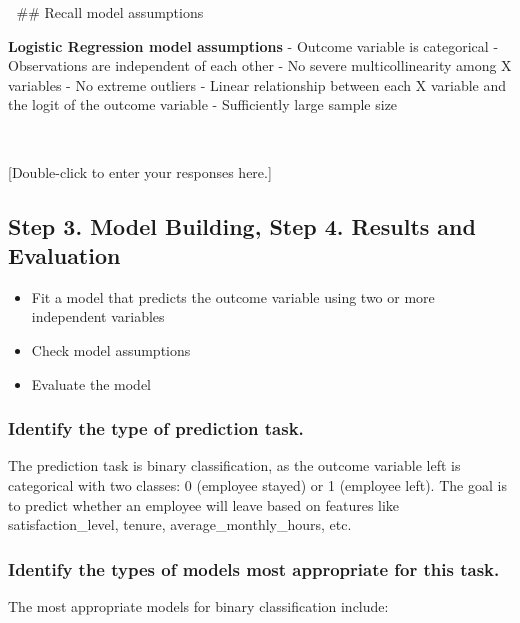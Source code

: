 \documentclass[11pt]{article}
\providecommand{\tightlist}{%
      \setlength{\itemsep}{0pt}\setlength{\parskip}{0pt}}
\begin{document}
    🔎 \#\# Recall model assumptions

\textbf{Logistic Regression model assumptions} - Outcome variable is
categorical - Observations are independent of each other - No severe
multicollinearity among X variables - No extreme outliers - Linear
relationship between each X variable and the logit of the outcome
variable - Sufficiently large sample size

    💭

    {[}Double-click to enter your responses here.{]}

    \hypertarget{step-3.-model-building-step-4.-results-and-evaluation}{%
\subsection{Step 3. Model Building, Step 4. Results and
Evaluation}\label{step-3.-model-building-step-4.-results-and-evaluation}}

\begin{itemize}
\tightlist
\item
  Fit a model that predicts the outcome variable using two or more
  independent variables
\item
  Check model assumptions
\item
  Evaluate the model
\end{itemize}

    \hypertarget{identify-the-type-of-prediction-task.}{%
\subsubsection{Identify the type of prediction
task.}\label{identify-the-type-of-prediction-task.}}

    The prediction task is binary classification, as the outcome variable
left is categorical with two classes: 0 (employee stayed) or 1 (employee
left). The goal is to predict whether an employee will leave based on
features like satisfaction\_level, tenure, average\_monthly\_hours, etc.

    \hypertarget{identify-the-types-of-models-most-appropriate-for-this-task.}{%
\subsubsection{Identify the types of models most appropriate for this
task.}\label{identify-the-types-of-models-most-appropriate-for-this-task.}}

    The most appropriate models for binary classification include:
\end{document}
